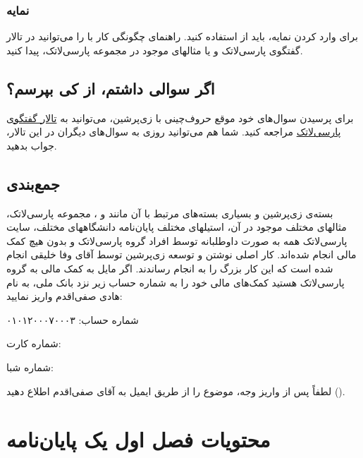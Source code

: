 \subsubsection{نمایه}
برای وارد کردن نمایه، باید از 
استفاده کنید. 
راهنمای چگونگی کار با 
را می‌توانید در تالار گفتگوی پارسی‌لاتک و یا مثالهای موجود در مجموعه پارسی‌لاتک، پیدا کنید.

\subsection{اگر سوالی داشتم، از کی بپرسم؟}
برای پرسیدن سوال‌های خود موقع حروف‌چینی با زی‌پرشین،  می‌توانید به
 \href{http://forum.parsilatex.com}{تالار گفتگوی پارسی‌لاتک}%
مراجعه کنید. شما هم می‌توانید روزی به سوال‌های دیگران در این تالار، جواب بدهید.
    
\subsection{جمع‌بندی}
بسته‌ی زی‌پرشین و بسیاری بسته‌های مرتبط با آن مانند  و ، مجموعه پارسی‌لاتک، مثالهای مختلف موجود در آن، استیلهای مختلف پایان‌نامه دانشگاههای مختلف، سایت پارسی‌لاتک همه به صورت داوطلبانه توسط افراد گروه پارسی‌لاتک و بدون هیچ کمک مالی انجام شده‌اند. کار اصلی نوشتن و توسعه زی‌پرشین توسط آقای وفا خلیقی انجام شده است که این کار بزرگ را به انجام رساندند.
اگر مایل به کمک مالی به گروه پارسی‌لاتک هستید کمک‌های مالی خود را به  شماره حساب 
زیر نزد بانک ملی، به نام هادی صفی‌اقدم واریز نمایید:
\begin{center}
شماره حساب: ۰۱۰۱۲۰۰۰۷۰۰۰۳

شماره کارت: 

شماره شبا: 
\end{center}
لطفاً پس از واریز وجه، موضوع را از طریق ایمیل به آقای صفی‌اقدم اطلاع دهید ().
\section{محتویات فصل اول یک پایان‌نامه}